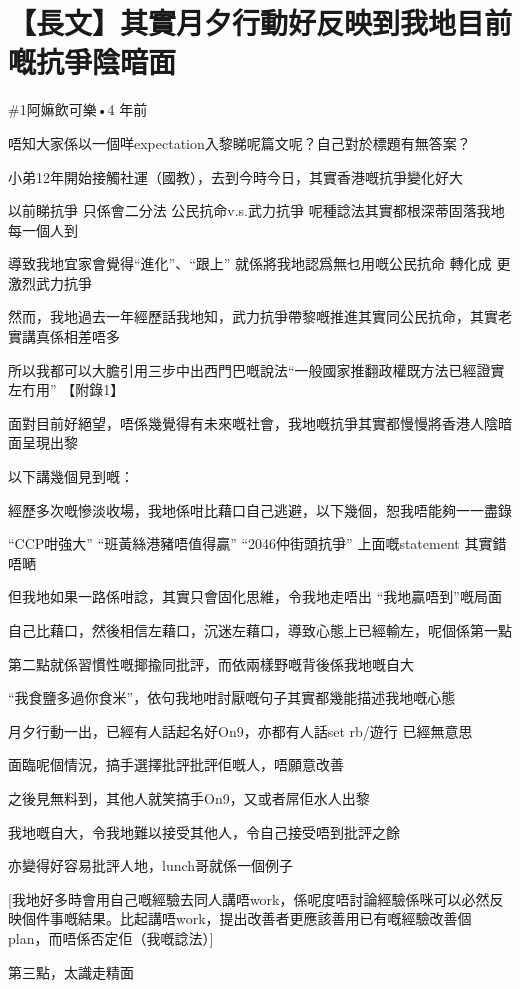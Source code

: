 \chapter{【長文】其實月夕行動好反映到我地目前嘅抗爭陰暗面}

\#1阿嫲飲可樂•4 年前

唔知大家係以一個咩expectation入黎睇呢篇文呢？自己對於標題有無答案？

小弟12年開始接觸社運（國教），去到今時今日，其實香港嘅抗爭變化好大

以前睇抗爭 只係會二分法 公民抗命v.s.武力抗爭 呢種諗法其實都根深蒂固落我地每一個人到

導致我地宜家會覺得“進化”、“跟上” 就係將我地認爲無乜用嘅公民抗命 轉化成 更激烈武力抗爭

然而，我地過去一年經歷話我地知，武力抗爭帶黎嘅推進其實同公民抗命，其實老實講真係相差唔多

所以我都可以大膽引用三步中出西門巴嘅說法“一般國家推翻政權既方法已經證實左冇用” 【附錄1】

面對目前好絕望，唔係幾覺得有未來嘅社會，我地嘅抗爭其實都慢慢將香港人陰暗面呈現出黎

以下講幾個見到嘅：

經歷多次嘅慘淡收場，我地係咁比藉口自己逃避，以下幾個，恕我唔能夠一一盡錄

“CCP咁強大” “班黃絲港豬唔值得贏” “2046仲街頭抗爭” 上面嘅statement 其實錯唔嗮

但我地如果一路係咁諗，其實只會固化思維，令我地走唔出 “我地贏唔到”嘅局面

自己比藉口，然後相信左藉口，沉迷左藉口，導致心態上已經輸左，呢個係第一點

第二點就係習慣性嘅揶揄同批評，而依兩樣野嘅背後係我地嘅自大

“我食鹽多過你食米”，依句我地咁討厭嘅句子其實都幾能描述我地嘅心態

月夕行動一出，已經有人話起名好On9，亦都有人話set rb/遊行 已經無意思

面臨呢個情況，搞手選擇批評批評佢嘅人，唔願意改善

之後見無料到，其他人就笑搞手On9，又或者屌佢水人出黎

我地嘅自大，令我地難以接受其他人，令自己接受唔到批評之餘

亦變得好容易批評人地，lunch哥就係一個例子

[我地好多時會用自己嘅經驗去同人講唔work，係呢度唔討論經驗係咪可以必然反映個件事嘅結果。比起講唔work，提出改善者更應該善用已有嘅經驗改善個plan，而唔係否定佢（我嘅諗法）]

第三點，太識走精面

